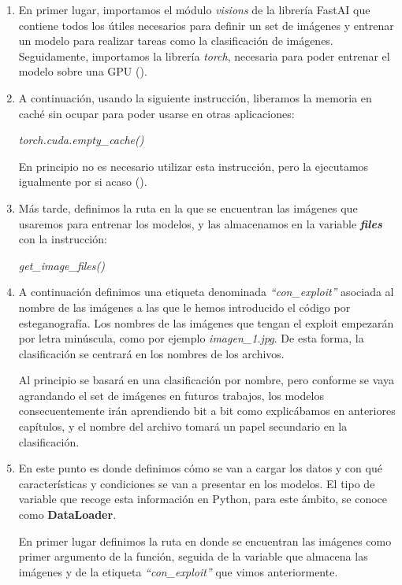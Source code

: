 \begin{enumerate}
\item En primer lugar, importamos el módulo \textit{visions} de la librería FastAI que contiene todos los útiles necesarios para definir un set de imágenes y entrenar un modelo para realizar tareas como la clasificación de imágenes. Seguidamente, importamos la librería \textit{torch}, necesaria para poder entrenar el modelo sobre una \ac{GPU} (\cite{pytorch}). %
\item A continuación, usando la siguiente instrucción, liberamos la memoria en caché sin ocupar para poder usarse en otras aplicaciones:

\begin{center}
\textit{torch.cuda.empty\_cache()}
\end{center}

En principio no es necesario utilizar esta instrucción, pero la ejecutamos igualmente por si acaso (\cite{cuda-empty-cache}).
\item Más tarde, definimos la ruta en la que se encuentran las imágenes que usaremos para entrenar los modelos, y las almacenamos en la variable \textbf{\textit{files}} con la instrucción:

\begin{center}
\textit{get\_image\_files()}
\end{center}

\item A continuación definimos una etiqueta denominada \textit{``con\_exploit''} asociada al nombre de las imágenes a las que le hemos introducido el código por esteganografía. Los nombres de las imágenes que tengan el exploit empezarán por letra minúscula, como por ejemplo \textit{imagen\_1.jpg}. De esta forma, la clasificación se centrará en los nombres de los archivos.

Al principio se basará en una clasificación por nombre, pero conforme se vaya agrandando el set de imágenes en futuros trabajos, los modelos consecuentemente irán aprendiendo bit a bit como explicábamos en anteriores capítulos, y el nombre del archivo tomará un papel secundario en la clasificación.

\item En este punto es donde definimos cómo se van a cargar los datos y con qué características y condiciones se van a presentar en los modelos. El tipo de variable que recoge esta información en Python, para este ámbito, se conoce como \textbf{DataLoader}.

En primer lugar definimos la ruta en donde se encuentran las imágenes como primer argumento de la función, seguida de la variable que almacena las imágenes y de la etiqueta \textit{``con\_exploit''} que vimos anteriormente.


\end{enumerate}

